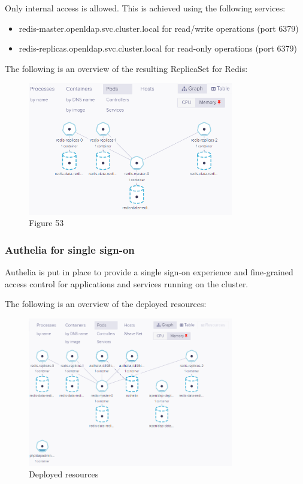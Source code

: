 \hspace{7mm}Only internal access is allowed. This is achieved using the following services: 

\begin{itemize}[label={--}]
\item redis-master.openldap.svc.cluster.local for read/write operations (port 6379) 
\item redis-replicas.openldap.svc.cluster.local for read-only operations (port 6379) 
\end{itemize}
\newpage
\hspace{7mm}The following is an overview of the resulting ReplicaSet for Redis: 

\begin{figure}[H]\centering
\includegraphics[width=0.8\textwidth,angle=00]{assets/f53.png}
\caption{Figure 53 }
\label{fig:f53}
\end{figure}

\subsubsection{Authelia for single sign-on }

\hspace{7mm}Authelia is put in place to provide a single sign-on experience and fine-grained access control for applications and services running on the cluster.

\hspace{7mm}The following is an overview of the deployed resources: 
\begin{figure}[H]\centering
\includegraphics[width=0.8\textwidth,angle=00]{assets/f54.png}
\caption{Deployed resources}
\label{fig:f54}
\end{figure}

